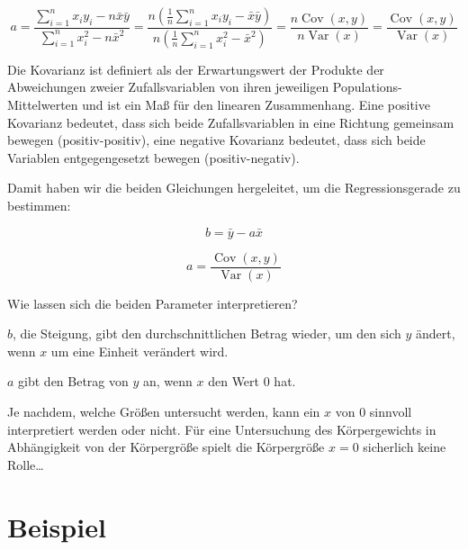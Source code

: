 \documentclass[ngerman, 12pt]{scrartcl}
\def\sm{\sum\limits_{i=1}^{n}}
\DeclareMathOperator{\cov}{Cov}
\DeclareMathOperator{\var}{Var}
\begin{document}
\begin{equation}
a =  \dfrac{\sm x_iy_i - n\bar{x}\bar{y}}{\sm x_i^2 -n\bar{x}^2} = \dfrac{n \left(\frac{1}{n}\sm x_iy_i - \bar{x}\bar{y}\right)}{ n\left( \frac{1}{n}\sm x_i^2 -\bar{x}^2\right)}  = \dfrac{n\cov(x,y)}{n\var(x)} = \dfrac{\cov(x,y)}{\var(x)}
\end{equation}

 
\begin{infobox}
Die Kovarianz ist definiert als der Erwartungswert der Produkte der Abweichungen zweier Zufallsvariablen von ihren jeweiligen Populations-Mittelwerten und ist ein Maß für den linearen Zusammenhang. Eine positive Kovarianz bedeutet, dass sich beide Zufallsvariablen in eine Richtung gemeinsam bewegen (positiv-positiv), eine negative Kovarianz bedeutet, dass sich beide Variablen entgegengesetzt bewegen (positiv-negativ).
\end{infobox}


Damit haben wir die beiden Gleichungen hergeleitet, um die Regressionsgerade zu bestimmen:

\begin{equation}
b=\bar{y} - a \bar{x}
\end{equation}


\begin{equation}
a =  \dfrac{\cov(x,y)}{\var(x)}
\end{equation}

Wie lassen sich die beiden Parameter interpretieren? 

\(b\), die Steigung, gibt den durchschnittlichen Betrag wieder, um den sich \(y\) ändert, wenn \(x\) um eine Einheit verändert wird. 

\(a\) gibt den Betrag von \(y\) an, wenn \(x\) den Wert 0 hat. 

Je nachdem, welche Größen untersucht werden, kann ein \(x\) von 0 sinnvoll interpretiert werden oder nicht. Für eine Untersuchung des  Körpergewichts in Abhängigkeit von der Körpergröße spielt die Körpergröße \(x=0\) sicherlich keine Rolle\ldots    

\clearpage\section{Beispiel}
\end{document}
